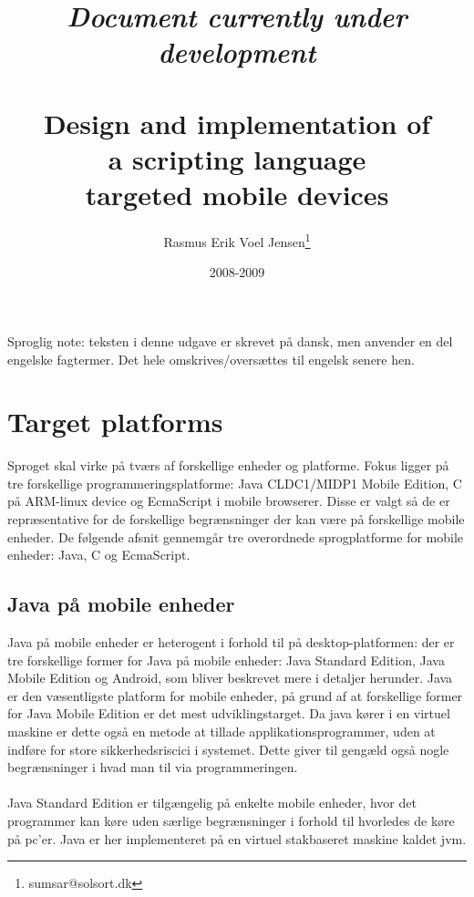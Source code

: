 \documentclass[12pt]{article}
\title{
\emph{Document currently under development} \\ ~ \\
Design and implementation of \\ 
a scripting language \\ 
targeted mobile devices}
\author{
  Rasmus Erik Voel Jensen\footnote{
    sumsar@solsort.dk
  }
}
\date{2008-2009}
\begin{document}

\maketitle
%
\tableofcontents

Sproglig note: teksten i denne udgave er skrevet på dansk, men anvender en del engelske fagtermer. 
Det hele omskrives/oversættes til engelsk senere hen.

\section{Target platforms}

Sproget skal virke på tværs af forskellige enheder og platforme. 
Fokus ligger på tre forskellige programmeringsplatforme: 
Java CLDC1/MIDP1 Mobile Edition, C på ARM-linux device og EcmaScript i mobile browserer.
Disse er valgt så de er repræsentative for de forskellige begrænsninger der kan være på forskellige mobile enheder.
De følgende afsnit gennemgår tre overordnede sprogplatforme for mobile enheder: Java, C og EcmaScript. 


\subsection{Java på mobile enheder}
Java på mobile enheder er heterogent i forhold til på desktop-platformen: 
der er tre forskellige former for Java på mobile enheder: Java Standard Edition, Java Mobile Edition og Android, som bliver beskrevet mere i detaljer herunder.
Java er den væsentligste platform for mobile enheder, på grund af at forskellige former for Java Mobile Edition er det mest udviklingstarget.
Da java kører i en virtuel maskine er dette også en metode at tillade applikationsprogrammer, uden at indføre for store sikkerhedsriscici i systemet. 
Dette giver til gengæld også nogle begrænsninger i hvad man til via programmeringen.


\paragraph{}
Java Standard Edition er tilgængelig på enkelte mobile enheder, hvor det programmer kan køre uden særlige begrænsninger i forhold til hvorledes de køre på pc'er.
Java er her implementeret på en virtuel stakbaseret maskine kaldet jvm.
\end{document}
